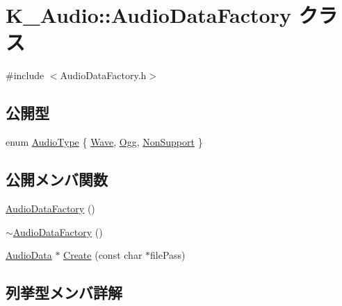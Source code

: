 \hypertarget{class_k___audio_1_1_audio_data_factory}{}\section{K\+\_\+\+Audio\+:\+:Audio\+Data\+Factory クラス}
\label{class_k___audio_1_1_audio_data_factory}


{\ttfamily \#include $<$Audio\+Data\+Factory.\+h$>$}

\subsection*{公開型}
\begin{DoxyCompactItemize}
\item 
enum \mbox{\hyperlink{class_k___audio_1_1_audio_data_factory_a070a4d999e204c8c78cd9f16a1c732ea}{Audio\+Type}} \{ \mbox{\hyperlink{class_k___audio_1_1_audio_data_factory_a070a4d999e204c8c78cd9f16a1c732eaac50f7a3cb913ee2eb98fe1664b442f6b}{Wave}}, 
\mbox{\hyperlink{class_k___audio_1_1_audio_data_factory_a070a4d999e204c8c78cd9f16a1c732eaac4e902b17eee79a21d1ab0550fb152be}{Ogg}}, 
\mbox{\hyperlink{class_k___audio_1_1_audio_data_factory_a070a4d999e204c8c78cd9f16a1c732eaab27c3fa7a2eb8cd78b05809b36596e10}{Non\+Support}}
 \}
\end{DoxyCompactItemize}
\subsection*{公開メンバ関数}
\begin{DoxyCompactItemize}
\item 
\mbox{\hyperlink{class_k___audio_1_1_audio_data_factory_a13e01c1708127344b0f8b44b27b847e0}{Audio\+Data\+Factory}} ()
\item 
\mbox{\hyperlink{class_k___audio_1_1_audio_data_factory_a922d66a38fbf21340c291283487388da}{$\sim$\+Audio\+Data\+Factory}} ()
\item 
\mbox{\hyperlink{class_k___audio_1_1_audio_data}{Audio\+Data}} $\ast$ \mbox{\hyperlink{class_k___audio_1_1_audio_data_factory_a2ab1886d205b300e8255b153ded7ffcb}{Create}} (const char $\ast$file\+Pass)
\end{DoxyCompactItemize}


\subsection{列挙型メンバ詳解}
\mbox{\label{class_k___audio_1_1_audio_data_factory_a070a4d999e204c8c78cd9f16a1c732ea}} 

